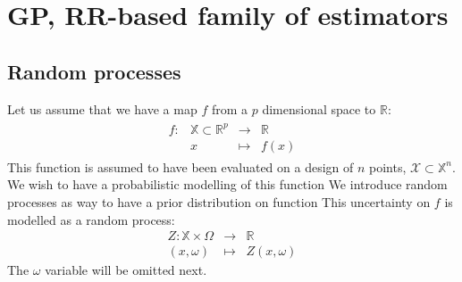 \documentclass[a4paper,11pt]{article}
\newcommand{\Uspace}{\mathbb{U}}
\theoremstyle{defi}
\numberwithin{thmCounter}{section}
\begin{document}
\newpage
\section{GP, RR-based family of estimators}
\subsection{Random processes}
Let us assume that we have a map $f$ from a $p$ dimensional space to $\mathbb{R}$:
\begin{align}
  \begin{array}{rrcl}
    f: & \mathbb{X} \subset \mathbb{R}^p& \longrightarrow & \mathbb{R} \\
       & x & \longmapsto & f(x)
  \end{array}
\end{align}
This function is assumed to have been evaluated on a design of $n$ points, $\mathcal{X} \subset \mathbb{X}^n$. 
We wish to have a probabilistic modelling of this function
We introduce random processes as way to have a prior distribution on function
This uncertainty on $f$ is modelled as a random process:
\begin{equation}
  \begin{array}{rcl}
    Z: \mathbb{X} \times \Omega& \longrightarrow & \mathbb{R} \\
    (x,\omega) & \longmapsto & Z(x,\omega)
  \end{array}
\end{equation}
The $\omega$ variable will be omitted next.
\end{document}
